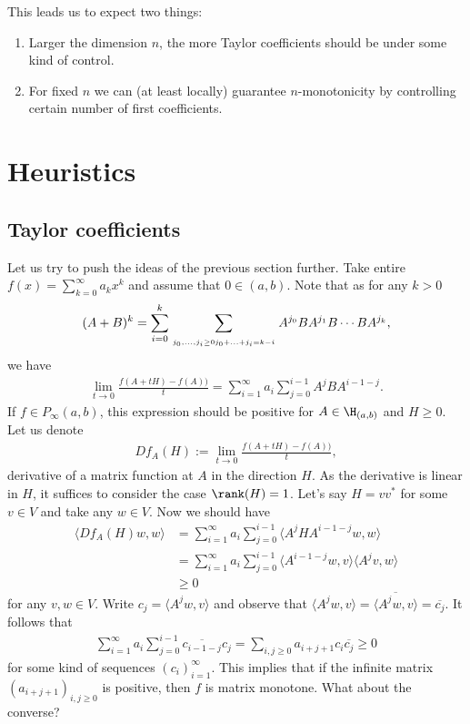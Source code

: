 This leads us to expect two things:

\begin{enumerate}
	\item Larger the dimension $n$, the more Taylor coefficients should be under some kind of control.
	\item For fixed $n$ we can (at least locally) guarantee $n$-monotonicity by controlling certain number of first coefficients.
\end{enumerate}

\section{Heuristics}

\subsection{Taylor coefficients}

Let us try to push the ideas of the previous section further. Take entire $f(x) = \sum_{k = 0}^{\infty} a_{k} x^{k}$ and assume that $0 \in (a, b)$. Note that as for any $k > 0$
\begin{align*}
	(A + B)^k = \sum_{i = 0}^{k} \sum_{\atop{j_{0}, \ldots, j_{i} \geq 0}{j_{0} + \ldots + j_{i} = k - i}} A^{j_{0}} B A^{j_{1}} B \cdots B A^{j_{k}},
\end{align*}
we have
\begin{align*}
	\lim_{t \to 0} \frac{f(A + t H) - f(A))}{t} = \sum_{i = 1}^{\infty} a_{i} \sum_{j = 0}^{i - 1} A^{j} B A^{i - 1 - j}.
\end{align*}
If $f \in P_{\infty}(a, b)$, this expression should be positive for $A \in \H_{(a, b)}$ and $H \geq 0$. Let us denote
\begin{align*}
	D f_{A}(H) := \lim_{t \to 0} \frac{f(A + t H) - f(A))}{t},
\end{align*}
derivative of a matrix function at $A$ in the direction $H$. As the derivative is linear in $H$, it suffices to consider the case $\rank(H) = 1$. Let's say $H = v v^{*}$ for some $v \in V$ and take any $w \in V$. Now we should have
\begin{align*}
	\langle D f_{A}(H) w, w \rangle &= \sum_{i = 1}^{\infty} a_{i} \sum_{j = 0}^{i - 1} \langle A^{j} H A^{i - 1 - j} w, w \rangle \\
	&= \sum_{i = 1}^{\infty} a_{i} \sum_{j = 0}^{i - 1} \langle  A^{i - 1 - j} w, v \rangle \langle A^{j} v, w \rangle \\
	&\geq 0
\end{align*}
for any $v, w \in V$. Write $c_{j} = \langle A^{j} w, v \rangle$ and observe that $\langle  A^{j} w, v \rangle = \overline{\langle A^{j} w, v \rangle} = \overline{c_{j}}$. It follows that
\begin{align*}
	\sum_{i = 1}^{\infty} a_{i} \sum_{j = 0}^{i - 1} \overline{c_{i - 1 - j}} c_{j} = \sum_{i, j \geq 0} a_{i + j + 1} c_{i} \overline{c_{j}} \geq 0
\end{align*}
for some kind of sequences $(c_{i})_{i = 1}^{\infty}$. This implies that if the infinite matrix $(a_{i + j + 1})_{i, j \geq 0}$ is positive, then $f$ is matrix monotone. What about the converse?


